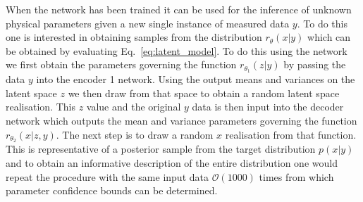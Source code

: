 \documentclass[%
showpacs,
 amsmath,amssymb,
 aps,
 twocolumn,
 prl,
 reprint,
floatfix,
]{revtex4-1}
\begin{document}
When the network has been trained it can be used for the inference of unknown
physical parameters given a new single instance of measured data $y$. To do
this one is interested in obtaining samples from the distribution
$r_{\theta}(x|y)$ which can be obtained by evaluating
Eq.~\ref{eq:latent_model}. To do this using the network we first obtain the
parameters governing the function $r_{\theta_{1}}(z|y)$ by passing the data $y$
into the encoder 1 network. Using the output means and variances on the latent space
$z$ we then draw from that space to obtain a random latent space realisation.
This $z$ value and the original $y$ data is then input into the decoder network
which outputs the mean and variance parameters governing the function
$r_{\theta_{2}}(x|z,y)$. The next step is to draw a random $x$ realisation from
that function. This is representative of a posterior sample from the target
distribution $p(x|y)$ and to obtain an informative description of the entire
distribution one would repeat the procedure with the same input data
$\mathcal{O}(1000)$ times from which parameter confidence bounds can be
determined.      
\end{document}
